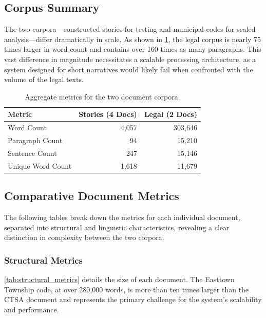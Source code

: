 \subsection{Corpus Summary}
The two corpora—constructed stories for testing and municipal codes for scaled analysis—differ dramatically in scale. As shown in \cref{tab:corpus_summary}, the legal corpus is nearly 75 times larger in word count and contains over 160 times as many paragraphs. This vast difference in magnitude necessitates a scalable processing architecture, as a system designed for short narratives would likely fail when confronted with the volume of the legal texts.

\begin{table}[!ht]
\centering
\begin{tabular}{lrr}
\toprule
\textbf{Metric} & \textbf{Stories (4 Docs)} & \textbf{Legal (2 Docs)} \\
\midrule
Word Count & 4,057 & 303,646 \\
Paragraph Count & 94 & 15,210 \\
Sentence Count & 247 & 15,146 \\
Unique Word Count & 1,618 & 11,679 \\
\bottomrule
\end{tabular}
\caption{Aggregate metrics for the two document corpora.}
\label{tab:corpus_summary}
\end{table}

\subsection{Comparative Document Metrics}
The following tables break down the metrics for each individual document, separated into structural and linguistic characteristics, revealing a clear distinction in complexity between the two corpora.

\subsubsection*{Structural Metrics}
\cref{tab:structural_metrics} details the size of each document. The Easttown Township code, at over 280,000 words, is more than ten times larger than the CTSA document and represents the primary challenge for the system's scalability and performance.

